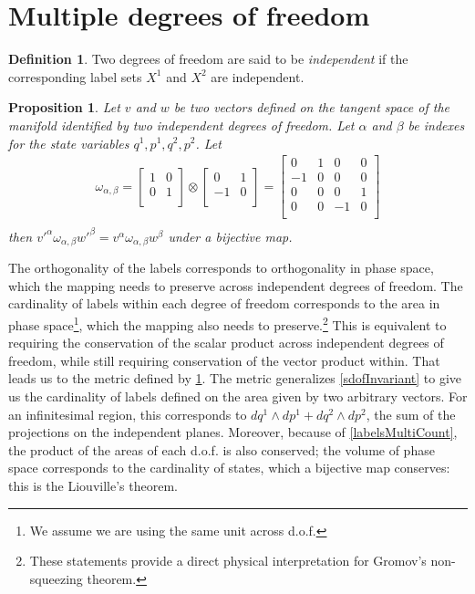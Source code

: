 \documentclass[twocolumn,floatfix,nofootinbib]{revtex4}   %
\theoremstyle{theorem}
\newtheorem{prop}[thm]{Proposition}
\theoremstyle{definition}
\newtheorem{defn}[thm]{Definition}
\begin{document}
\section{Multiple degrees of freedom}

\begin{defn}\label{mdof}
Two degrees of freedom are said to be \emph{independent} if the corresponding label sets $X^1$ and $X^2$ are independent.
\end{defn}

\begin{prop}\label{mdofInvariant}
Let $v$ and $w$ be two vectors defined on the tangent space of the manifold identified by two independent degrees of freedom. Let $\alpha$ and $\beta$ be indexes for the state variables $q^1, p^1, q^2, p^2$. Let
\begin{align*}
\omega_{\alpha, \beta} =  \left[
  \begin{array}{cc}
    1 & 0 \\
    0 & 1 \\
  \end{array}
\right] \otimes \left[
  \begin{array}{cc}
    0 & 1 \\
    -1 & 0 \\
  \end{array}
\right] =
\left[
  \begin{array}{cccc}
    0 & 1 & 0 & 0 \\
    -1 & 0 & 0 & 0 \\
    0 & 0 & 0 & 1 \\
    0 & 0 & -1 & 0 \\
  \end{array}
\right] \\
\end{align*}
then $v'^{\alpha} \omega_{\alpha, \beta} w'^{\beta}=v^{\alpha} \omega_{\alpha, \beta} w^{\beta}$ under a bijective map.
\end{prop}

The orthogonality of the labels corresponds to orthogonality in phase space, which the mapping needs to preserve across independent degrees of freedom. The cardinality of labels within each degree of freedom corresponds to the area in phase space\footnote{We assume we are using the same unit across d.o.f.}, which the mapping also needs to preserve.\footnote{These statements provide a direct physical interpretation for Gromov's non-squeezing theorem.\cite{Gromov}\cite{deGosson}\cite{Stewart}} This is equivalent to requiring the conservation of the scalar product across independent degrees of freedom, while still requiring conservation of the vector product within. That leads us to the metric defined by \ref{mdofInvariant}.
The metric generalizes \ref{sdofInvariant} to give us the cardinality of labels defined on the area given by two arbitrary vectors. For an infinitesimal region, this corresponds to $dq^1 \wedge dp^1 + dq^2 \wedge dp^2$, the sum of the projections on the independent planes. Moreover, because of \ref{labelsMultiCount}, the product of the areas of each d.o.f. is also conserved; the volume of phase space corresponds to the cardinality of states, which a bijective map conserves: this is the Liouville's theorem.
\end{document}
